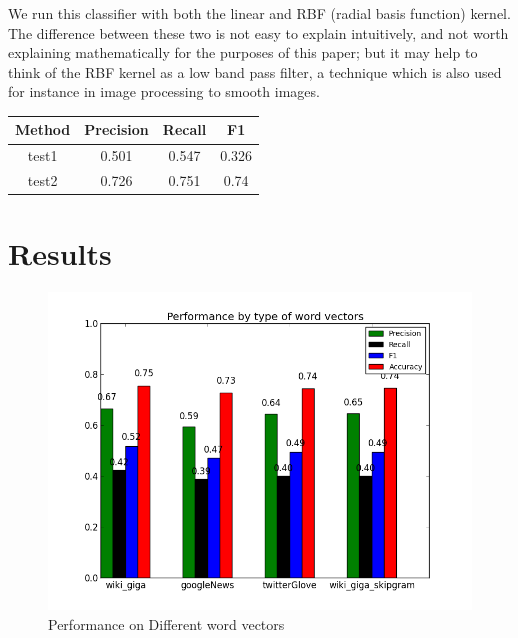 \documentclass[conference]{IEEEtran}
\begin{document}
We run this classifier with both the linear and RBF (radial basis function) kernel.  The difference between these two is not easy to explain intuitively, and not worth explaining mathematically for the purposes of this paper; but it may help to think of the RBF kernel as a low band pass filter, a technique which is also used for instance in image processing to smooth images. \cite{RBF}

\begin{center}
\begin{tabular}{| c | c | c | c |}
\hline
 Method & Precision & Recall & F1 \\ \hline
test1 & 0.501 & 0.547 & 0.326 \\ \hline
 test2 & 0.726 & 0.751 & 0.74 \\ 
 \hline
\end{tabular}
\end{center}

\section{Results}

\begin{figure}
	\centering
	\includegraphics[scale=0.4]{cmp_vecs.png}
	\caption{Performance on Different word vectors}
	\label{vectorSelect}
\end{figure}
\end{document}
